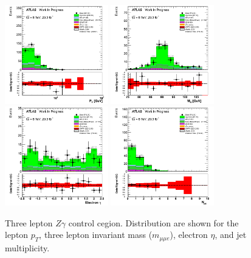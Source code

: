\begin{figure}[htp]
\centering
\includegraphics[width=0.4\textwidth]{figures/ZG_CR/AllLeptonPt_histratio.png}
\includegraphics[width=0.4\textwidth]{figures/ZG_CR/InvariantMassThreeLep_histratio.png}
\includegraphics[width=0.4\textwidth]{figures/ZG_CR/ElectronEta_histratio.png}
\includegraphics[width=0.4\textwidth]{figures/ZG_CR/NJets_histratio.png}

\caption{Three lepton $Z\gamma$ control cegion. Distribution are shown for the
lepton $p_{T}$, three lepton invariant mass ($m_{\mu\mu e}$), electron $\eta$, 
and jet multiplicity.}
\label{fig:Zgamma_CR}
\end{figure}  


